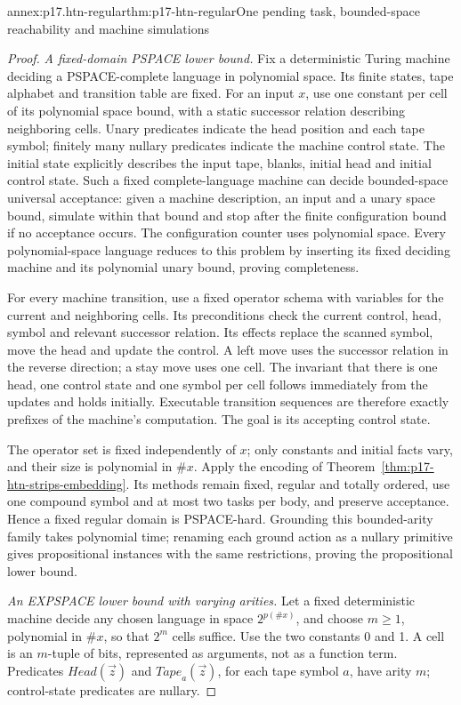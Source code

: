\begin{annexitem}{annex:p17.htn-regular}{thm:p17-htn-regular}{One pending task, bounded-space reachability and machine simulations}
\begin{proof}
\emph{A fixed-domain PSPACE lower bound.} Fix a deterministic Turing machine
deciding a PSPACE-complete language in polynomial space. Its finite states,
tape alphabet and transition table are fixed. For an input \(x\), use one
constant per cell of its polynomial space bound, with a static successor
relation describing neighboring cells. Unary predicates indicate the head
position and each tape symbol; finitely many nullary predicates indicate
the machine control state. The initial state explicitly describes the
input tape, blanks, initial head and initial control state.
Such a fixed complete-language machine can decide bounded-space universal
acceptance: given a machine description, an input and a unary space bound,
simulate within that bound and stop after the finite configuration bound
if no acceptance occurs. The configuration counter uses polynomial space.
Every polynomial-space language reduces to this problem by inserting its
fixed deciding machine and its polynomial unary bound, proving completeness.

For every machine transition, use a fixed operator schema with variables
for the current and neighboring cells. Its preconditions check the current
control, head, symbol and relevant successor relation. Its effects replace
the scanned symbol, move the head and update the control. A left move uses
the successor relation in the reverse direction; a stay move uses one cell.
The invariant that there is one head, one control state and one symbol per
cell follows immediately from the updates and holds initially. Executable
transition sequences are therefore exactly prefixes of the machine's
computation. The goal is its accepting control state.

The operator set is fixed independently of \(x\); only constants and
initial facts vary, and their size is polynomial in \(\#x\). Apply the
encoding of Theorem~\ref{thm:p17-htn-strips-embedding}. Its methods remain
fixed, regular and totally ordered, use one compound symbol and at most
two tasks per body, and preserve acceptance. Hence a fixed regular domain
is PSPACE-hard. Grounding this bounded-arity family takes polynomial time;
renaming each ground action as a nullary primitive gives propositional
instances with the same restrictions, proving the propositional lower bound.

\emph{An EXPSPACE lower bound with varying arities.} Let a fixed deterministic
machine decide any chosen language in space \(2^{p(\#x)}\), and choose
\(m\geq1\), polynomial in \(\#x\), so that \(2^m\) cells suffice.
Use the two constants 0 and 1. A cell is an \(m\)-tuple of bits, represented
as arguments, not as a function term. Predicates
\(\mathit{Head}(\vec z)\) and \(\mathit{Tape}_a(\vec z)\), for each
tape symbol \(a\), have arity \(m\); control-state predicates are nullary.


\end{proof}
\end{annexitem}
